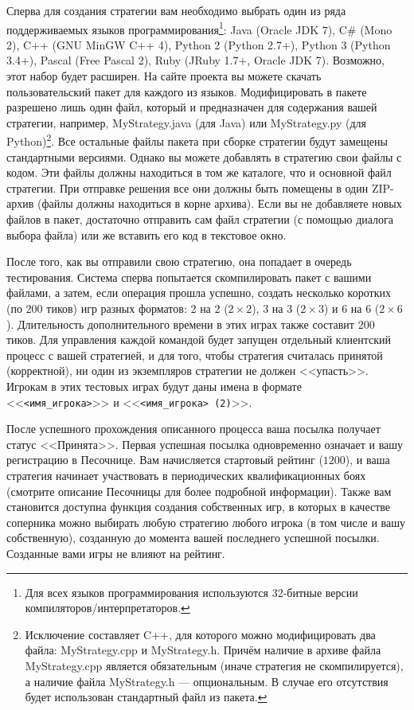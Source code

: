 Сперва для создания стратегии вам необходимо выбрать один из ряда поддерживаемых языков программирования\footnote[6]{Для всех языков
программирования используются 32-битные версии компиляторов/интерпретаторов.}: Java (Oracle JDK 7), C\# (Mono 2), C++ (GNU MinGW C++ 4),
Python 2 (Python 2.7+), Python 3 (Python 3.4+), Pascal (Free Pascal 2), Ruby (JRuby 1.7+, Oracle JDK 7). Возможно, этот набор будет
расширен. На сайте проекта вы можете скачать пользовательский пакет для каждого из языков. Модифицировать в пакете разрешено лишь один файл,
который и предназначен для содержания вашей стратегии, например, MyStrategy.java (для Java) или MyStrategy.py (для
Python)\footnote[7]{Исключение составляет C++, для которого можно модифицировать два файла: MyStrategy.cpp и MyStrategy.h. Причём наличие в
архиве файла MyStrategy.cpp является обязательным (иначе стратегия не скомпилируется), а наличие файла MyStrategy.h --- опциональным. В
случае его отсутствия будет использован стандартный файл из пакета.}. Все остальные файлы пакета при сборке стратегии будут замещены
стандартными версиями. Однако вы можете добавлять в стратегию свои файлы с кодом. Эти файлы должны находиться в том же каталоге, что и
основной файл стратегии. При отправке решения все они должны быть помещены в один ZIP-архив (файлы должны находиться в корне архива). Если
вы не добавляете новых файлов в пакет, достаточно отправить сам файл стратегии (с помощью диалога выбора файла) или же вставить его код в
текстовое окно.

После того, как вы отправили свою стратегию, она попадает в очередь тестирования. Система сперва попытается скомпилировать пакет с вашими
файлами, а затем, если операция прошла успешно, создать несколько коротких (по $200$ тиков) игр разных форматов: 2 на 2 ($2\times2$), 3 на 3
($2\times3$) и 6 на 6 ($2\times6$). Длительность дополнительного времени в этих играх также составит $200$ тиков. Для управления каждой
командой будет запущен отдельный клиентский процесс с вашей стратегией, и для того, чтобы стратегия считалась принятой (корректной), ни один
из экземпляров стратегии не должен <<упасть>>. Игрокам в этих тестовых играх будут даны имена в формате <<\texttt{<имя\_игрока>}>> и
<<\texttt{<имя\_игрока> (2)}>>.

После успешного прохождения описанного процесса ваша посылка получает статус <<Принята>>. Первая успешная посылка одновременно означает и
вашу регистрацию в Песочнице. Вам начисляется стартовый рейтинг ($1200$), и ваша стратегия начинает участвовать в периодических
квалификационных боях (смотрите описание Песочницы для более подробной информации). Также вам становится доступна функция создания
собственных игр, в которых в качестве соперника можно выбирать любую стратегию любого игрока (в том числе и вашу собственную), созданную до
момента вашей последнего успешной посылки. Созданные вами игры не влияют на рейтинг.

